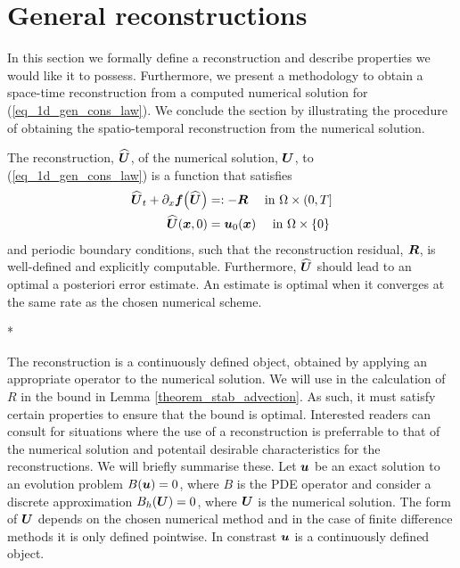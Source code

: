 \documentclass[final]{amsart}
\newcommand{\recgs}[1]{\widehat{\vec{#1}}}
\renewcommand{\vect}[1]{\geovec{#1}}
\renewcommand{\vec}[1]{\geovec{#1}}
\numberwithin{equation}{section}
\begin{document}
\section{General reconstructions}\label{sec:general_reconstructions}

In this section we formally define a reconstruction and describe properties we would like it to possess.  Furthermore, we present a
methodology to obtain a space-time reconstruction from a computed
numerical solution for (\ref{eq_1d_gen_cons_law}).  We conclude the
section by illustrating the procedure of obtaining the spatio-temporal reconstruction from the numerical solution.

\begin{Defn}[Reconstruction]\label{defn_reconstruction}
The reconstruction, $\recgs{U}$, of the numerical solution, $\vec{U}$, to (\ref{eq_1d_gen_cons_law}) is a function that satisfies 
\begin{equation}
\label{eq:ibvpU}
\begin{aligned}
\widehat{\vect{U}}_t+\partial_x\vect{f\qp{\widehat{\vect{U}}}}
&=:-\vect{R}\quad \text{ in }\W \times (0,T]
\\
\widehat{\vect{U}}(\vect x,0) &= \vect{u}_0(\vect x) \quad \text{ in } \W \times \{0\}
\end{aligned}
\end{equation}
and periodic boundary conditions, such that the reconstruction residual, $\vect{R}$, is well-defined and
explicitly computable.  Furthermore,
$\widehat{\vect{U}}$ should lead to an optimal a posteriori
error estimate.  An estimate
is optimal when it converges at the same rate as the chosen numerical
scheme.
\end{Defn}



\/*

 The  reconstruction is a continuously defined object, obtained by applying an appropriate operator to the numerical solution. We will use in the calculation of $R$ in the bound in Lemma \ref{theorem_stab_advection}.  As such, it must satisfy certain properties to ensure that the bound  is optimal.  Interested readers can consult \cite[\S2]{makridakis2007space} for situations where the use of a reconstruction is preferrable to that of the numerical solution and potentail desirable characteristics for the reconstructions.  We will briefly summarise these.
Let $\vect u$ be an exact solution to an evolution problem $B\qp{\vect u}=0$, where $B$ is the PDE operator and consider a discrete approximation $B_h\qp{\vect U}=0$, where $\vect U$ is the numerical solution.  The form of $\vect U$ depends on the chosen numerical method and in the case of finite difference methods it is only defined pointwise. In constrast $\vect u$ is a continuously defined object.
\end{document}
